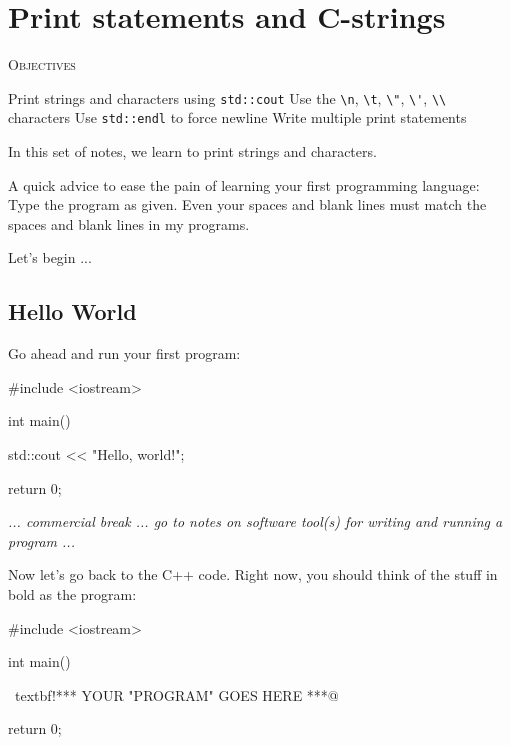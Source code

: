 \chapter{Print statements and C-strings}


\textsc{Objectives}
\begin{tightlist}
\li Print strings and characters using \verb!std::cout!
\li Use the \verb!\n!, \verb!\t!, \verb!\"!, \verb!\'!, 
    \verb!\\! characters
\li Use \verb!std::endl! to force newline
\li Write multiple print statements
\end{tightlist}

In this set of notes, we learn to print strings and characters.

A quick advice to ease the pain of learning your first programming language: 
Type the program 
 as given. 
Even your spaces and blank lines must match the spaces 
and blank lines in my programs.

Let's begin ...


\newpage\section{Hello World}

Go ahead and run your first program:
\begin{console}
#include <iostream>

int main()
{
    std::cout << "Hello, world!\n";

    return 0;
}
\end{console}

{\it ... commercial break ... go to notes on software tool(s) for writing and 
running a program ...}

Now let's go back to the C++ code. Right now, you should think of the stuff in bold as the program:
\begin{console}[commandchars=\~\!\@]
#include <iostream>

int main()
{
    ~textbf!*** YOUR "PROGRAM" GOES HERE ***@

    return 0;
}
\end{console}


